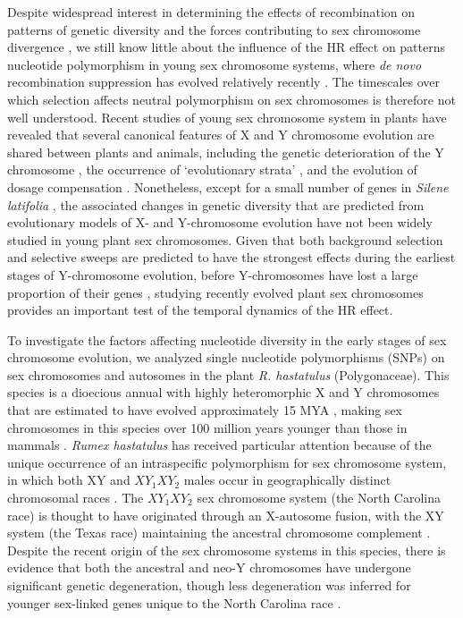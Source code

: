 \documentclass[9pt,twocolumn,twoside]{gsajnl}
\begin{document}
Despite widespread interest in determining the effects of recombination on patterns of genetic diversity and the forces contributing to sex chromosome divergence \citep{ellegren2011,otto2011PAR,bachtrog2013NRG}, we still know little about the influence of the HR effect on patterns nucleotide polymorphism in young sex chromosome systems, where \textit{de novo} recombination suppression has evolved relatively recently \citep{charlesworth2016plant}. The timescales over which selection affects neutral polymorphism on sex chromosomes is therefore not well understood. Recent studies of young sex chromosome system in plants have revealed that several canonical features of X and Y chromosome evolution are shared between plants and animals, including the genetic deterioration of the Y chromosome \citep{bergero2015,hough2014}, the occurrence of ‘evolutionary strata’ \citep{bergero2009}, and the evolution of dosage compensation \citep{muyle2012,papadopulos2015}. Nonetheless, except for a small number of genes in \textit{Silene latifolia} \citep{filatov2001diversity,qiu2010nucleotide}, the associated changes in genetic diversity that are predicted from evolutionary models of X- and Y-chromosome evolution have not been widely studied in young plant sex chromosomes. Given that both background selection and selective sweeps are predicted to have the strongest effects during the earliest stages of Y-chromosome evolution, before Y-chromosomes have lost a large proportion of their genes \citep{bachtrog2008temporal}, studying recently evolved plant sex chromosomes provides an important test of the temporal dynamics of the HR effect.

To investigate the factors affecting nucleotide diversity in the early stages of sex chromosome evolution, we analyzed single nucleotide polymorphisms (SNPs) on sex chromosomes and autosomes in the plant \textit{R. hastatulus }(Polygonaceae). This species is a dioecious annual with highly heteromorphic X and Y chromosomes that are estimated to have evolved  approximately 15 MYA \citep{quesada2011,grabowska2015,navajas2005}, making sex chromosomes in this species over 100 million years younger than those in mammals \citep{lahn1999,ross2005dna}. \textit{Rumex hastatulus} has received particular attention because of the unique occurrence of an intraspecific polymorphism for sex chromosome system, in which both XY and $XY_{1}XY_{2}$ males occur in geographically distinct chromosomal races \citep{smith1963mechanism}. The $XY_{1}XY_{2}$ sex chromosome system (the North Carolina race) is thought to have originated through an X-autosome fusion, with the XY system (the Texas race) maintaining the ancestral chromosome complement \citep{smith1964evolving}. Despite the recent origin of the sex chromosome systems in this species, there is evidence that both the ancestral and neo-Y chromosomes have undergone significant genetic degeneration, though less degeneration was inferred for younger sex-linked genes unique to the North Carolina race \citep{hough2014}. 
\end{document}
